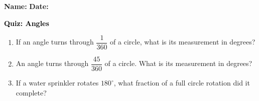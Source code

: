 \documentclass[12pt, letterpaper, fleqn]{article}
\begin{document}
\textbf{Name:} \underline{\hspace{5cm}}
\hfill
\textbf{Date:} \underline{\hspace{3cm}}\\

\begin{tcolorbox}[colback=customteal!20]
    \large\textcolor{black}{\textbf{Quiz: Angles}}
\end{tcolorbox}
\begin{enumerate}[itemsep=3.5cm, leftmargin=0.6cm]
\item If an angle turns through $\dfrac{1}{360}$ of a circle, what is its measurement in degrees?
\vspace{3.5cm}
\item An angle turns through $\dfrac{45}{360}$ of a circle. What is its measurement in degrees?
\vspace{3.5cm}
\item If a water sprinkler rotates $180^\circ$, what fraction of a full circle rotation did it complete?
\end{enumerate}
\end{document}
